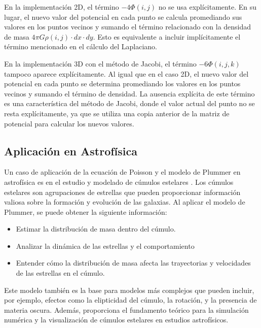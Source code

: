 \documentclass[reprint,amsmath,amssymb,aps]{revtex4-1}
\begin{document}
En la implementación 2D, el término $-4\Phi(i, j)$ no se usa explícitamente. En su lugar, el nuevo valor del potencial en cada punto se calcula promediando sus valores en los puntos vecinos y sumando el término relacionado con la densidad de masa $4\pi G \rho(i, j) \cdot dx \cdot dy$. Esto es equivalente a incluir implícitamente el término mencionado en el cálculo del Laplaciano.

En la implementación 3D con el método de Jacobi, el término $-6\Phi(i, j, k)$ tampoco aparece explícitamente. Al igual que en el caso 2D, el nuevo valor del potencial en cada punto se determina promediando los valores en los puntos vecinos y sumando el término de densidad. La ausencia explícita de este término es una característica del método de Jacobi, donde el valor actual del punto no se resta explícitamente, ya que se utiliza una copia anterior de la matriz de potencial para calcular los nuevos valores.

\subsection{Aplicación en Astrofísica}
Un caso de aplicación de la ecuación de Poisson y el modelo de Plummer en astrofísica es en el estudio y modelado de cúmulos estelares \cite{astro,astro1,astro2}. Los cúmulos estelares son agrupaciones de estrellas que pueden proporcionar información valiosa sobre la formación y evolución de las galaxias. Al aplicar el modelo de Plummer, se puede obtener la siguiente información:
\begin{itemize}
    \item Estimar la distribución de masa dentro del cúmulo.
     \item Analizar la dinámica de las estrellas y el comportamiento
    \item Entender cómo la distribución de masa afecta las trayectorias y velocidades de las estrellas en el cúmulo.
\end{itemize}

Este modelo también es la base para modelos más complejos que pueden incluir, por ejemplo, efectos como la elipticidad del cúmulo, la rotación, y la presencia de materia oscura. Además, proporciona el fundamento teórico para la simulación numérica y la visualización de cúmulos estelares en estudios astrofísicos.
\end{document}
